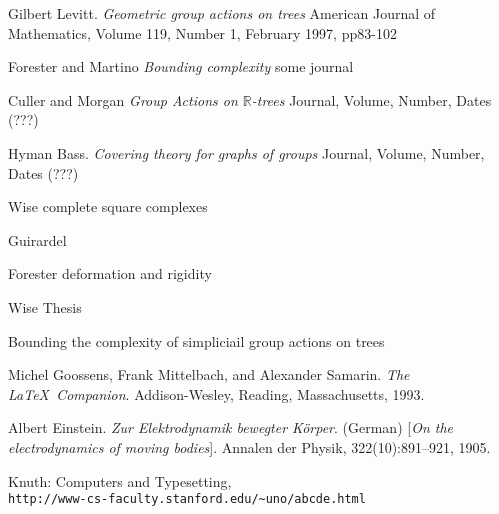 \documentclass[12pt,parskip=full]{report}
\theoremstyle{plain}
\theoremstyle{definition}
\begin{document}







\begin{thebibliography}{9}


Gilbert Levitt.
\textit{Geometric group actions on trees}
American Journal of Mathematics, Volume 119, Number 1, February 1997, pp83-102

Forester and Martino
\textit{Bounding complexity}
some journal

Culler and Morgan
\textit{Group Actions on $\mathbb{R}$-trees}
Journal, Volume, Number, Dates (???)

Hyman Bass.
\textit{Covering theory for graphs of groups}
Journal, Volume, Number, Dates (???)


Wise complete square complexes

Guirardel

Forester deformation and rigidity

Wise Thesis

Bounding the complexity of simpliciail group actions
on trees 


Michel Goossens, Frank Mittelbach, and Alexander Samarin. 
\textit{The \LaTeX\ Companion}. 
Addison-Wesley, Reading, Massachusetts, 1993.

Albert Einstein. 
\textit{Zur Elektrodynamik bewegter K{\"o}rper}. (German) 
[\textit{On the electrodynamics of moving bodies}]. 
Annalen der Physik, 322(10):891–921, 1905.

Knuth: Computers and Typesetting,
\\\texttt{http://www-cs-faculty.stanford.edu/\~{}uno/abcde.html}

\end{thebibliography}



\end{document}
